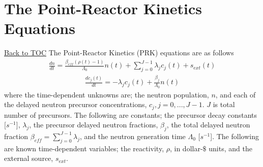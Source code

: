 \documentclass[11pt,letterpaper,notitlepage]{article}
\numberwithin{equation}{section}
\newcommand{\BackToTOC}{\hyperlink{toc}{\scriptsize{\color{blue}Back to TOC}}\newline}
\begin{document}

\section{The Point-Reactor Kinetics Equations}\BackToTOC
The Point-Reactor Kinetics (PRK) equations are as follows
\begin{equation}
	\begin{aligned}
		\frac{dn}{dt} = \frac{\beta_{eff} ( \rho (t) - 1)}{\Lambda_0}  n(t) + 
		\sum_{j=0}^{J-1} \lambda_j c_j (t) + s_{ext}(t)
	\end{aligned}
\end{equation}
\begin{equation}
	\begin{aligned}
		\frac{dc_j(t)}{dt} = -\lambda_j c_j(t) + \frac{\beta_{j}}{\Lambda_0} n(t)
	\end{aligned}
\end{equation}
where the time-dependent unknowns are; the neutron population, $n$, and each of the delayed neutron precursor concentrations, $c_j, j=0,...,J-1$. $J$ is total number of precursors. The following are constants; the precursor decay constants [$s^{-1}$], $\lambda_j$, the precursor delayed neutron fractions, $\beta_j$, the total delayed neutron fraction $\beta_{eff} = \sum_{j=0}^{J-1}\lambda_j$, and the neutron generation time $\Lambda_0$ [$s^{-1}$]. The following are known time-dependent variables; the reactivity, $\rho$, in dollar-$\$ $ units, and the external source, $s_{ext}$.
\end{document}
